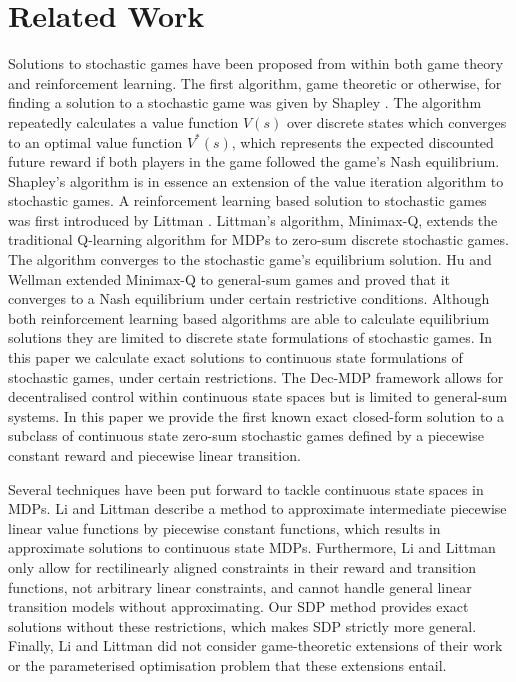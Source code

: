 \section{Related Work}
\label{sec:relatedwork}

Solutions to stochastic games have been proposed from within both
game theory and reinforcement learning. The first algorithm, game theoretic or otherwise, for 
finding a solution to a stochastic game was given by Shapley \cite{Shapley_PotNAoS_1953}.
The algorithm repeatedly calculates a value function $V(s)$ over discrete states
which converges to an optimal value function $V^{*}(s)$, which represents
the expected discounted future reward if both players in the game followed
the game's Nash equilibrium. Shapley's algorithm is in essence an 
extension of the value iteration algorithm to stochastic games. A reinforcement 
learning based solution to stochastic games was first introduced by 
Littman \cite{Littman_ICML_1994}. Littman's algorithm, Minimax-Q,
extends the traditional Q-learning algorithm for MDPs to 
zero-sum discrete stochastic games. The algorithm converges to the 
stochastic game's equilibrium solution. Hu and Wellman \cite{Hu_ICML_1998}
extended Minimax-Q to general-sum games and proved that it converges
to a Nash equilibrium under certain restrictive conditions. Although
both reinforcement learning based algorithms are able to calculate 
equilibrium solutions they are limited to discrete state formulations of
stochastic games. In this paper we calculate exact solutions to 
continuous state formulations of stochastic games, under certain restrictions.
The Dec-MDP \cite{Bernstein_MoOR_2002} framework allows
for decentralised control within continuous state spaces but is limited
to general-sum systems. In this paper we provide the first 
known exact closed-form solution to a subclass of continuous state zero-sum 
stochastic games defined by a piecewise constant reward and piecewise linear transition.

Several techniques have been put forward to tackle continuous state
spaces in MDPs. Li and Littman \cite{Li_AAAI_2005} describe a method
to approximate intermediate piecewise linear value functions by piecewise
constant functions, which results in approximate solutions to continuous
state MDPs. Furthermore, Li and Littman only allow for rectilinearly aligned 
constraints in their reward and transition functions, not arbitrary linear constraints,
and cannot handle general linear transition models without approximating.  
Our SDP method provides exact solutions without these restrictions, which
makes SDP strictly more general. Finally, Li and Littman did not consider 
game-theoretic extensions of their work or the parameterised optimisation 
problem that these extensions entail.


